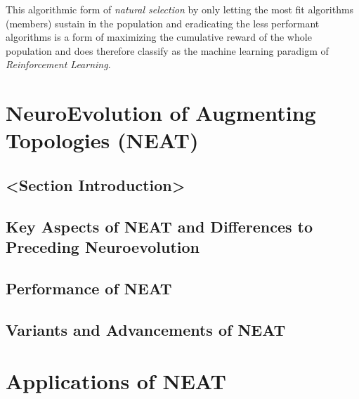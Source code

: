 \documentclass[journal, a4paper]{IEEEtran}
\begin{document}
This algorithmic form of \textit{natural selection} by only letting the most fit algorithms (members) sustain in the population and eradicating the less performant algorithms is a form of maximizing the cumulative reward of the whole population and does therefore classify as the machine learning paradigm of \textit{Reinforcement Learning}.






\section{NeuroEvolution of Augmenting Topologies (NEAT)}

\subsection{<Section Introduction>}

\subsection{Key Aspects of NEAT and Differences to Preceding Neuroevolution}

\subsection{Performance of NEAT}
    
\subsection{Variants and Advancements of NEAT}




\section{Applications of NEAT}
\end{document}
